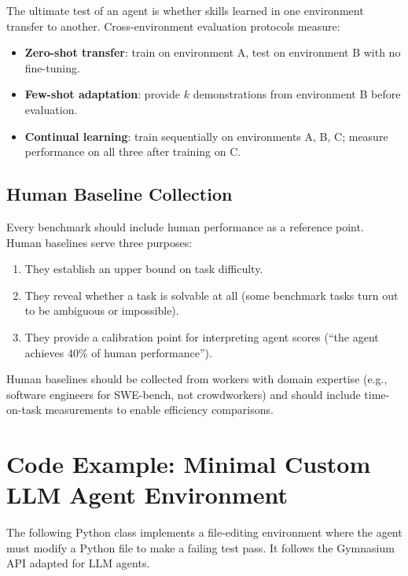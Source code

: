 The ultimate test of an agent is whether skills learned in one environment transfer to another. Cross-environment evaluation protocols measure:

\begin{itemize}
  \item \textbf{Zero-shot transfer}: train on environment A, test on environment B with no fine-tuning.
  \item \textbf{Few-shot adaptation}: provide $k$ demonstrations from environment B before evaluation.
  \item \textbf{Continual learning}: train sequentially on environments A, B, C; measure performance on all three after training on C.
\end{itemize}

\subsection{Human Baseline Collection}
\label{human-baseline-collection}

Every benchmark should include human performance as a reference point. Human baselines serve three purposes:

\begin{enumerate}
  \item They establish an upper bound on task difficulty.
  \item They reveal whether a task is solvable at all (some benchmark tasks turn out to be ambiguous or impossible).
  \item They provide a calibration point for interpreting agent scores (``the agent achieves 40\% of human performance'').
\end{enumerate}

Human baselines should be collected from workers with domain expertise (e.g., software engineers for SWE-bench, not crowdworkers) and should include time-on-task measurements to enable efficiency comparisons.

\section{Code Example: Minimal Custom LLM Agent Environment}
\label{sec:code-example}

\begin{examplebox}
The following Python class implements a file-editing environment where the agent must modify a Python file to make a failing test pass. It follows the Gymnasium API adapted for LLM agents.
\end{examplebox}

